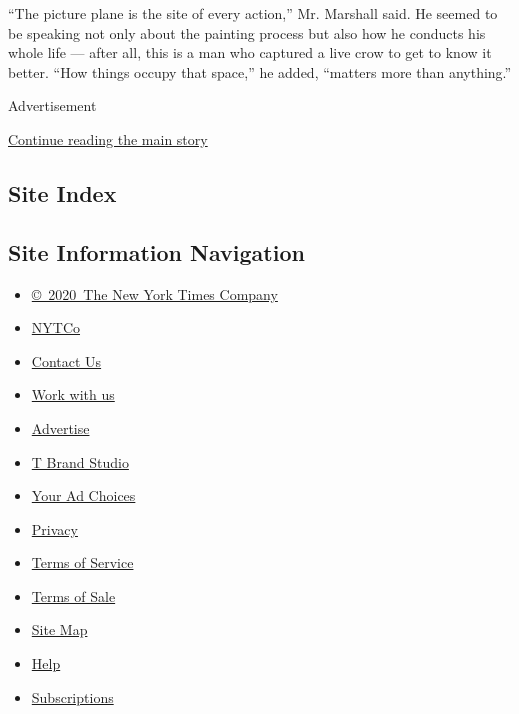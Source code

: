 ``The picture plane is the site of every action,'' Mr. Marshall said. He
seemed to be speaking not only about the painting process but also how
he conducts his whole life --- after all, this is a man who captured a
live crow to get to know it better. ``How things occupy that space,'' he
added, ``matters more than anything.''

Advertisement

\protect\hyperlink{after-bottom}{Continue reading the main story}

\hypertarget{site-index}{%
\subsection{Site Index}\label{site-index}}

\hypertarget{site-information-navigation}{%
\subsection{Site Information
Navigation}\label{site-information-navigation}}

\begin{itemize}
\tightlist
\item
  \href{https://help.nytimes3xbfgragh.onion/hc/en-us/articles/115014792127-Copyright-notice}{©~2020~The
  New York Times Company}
\end{itemize}

\begin{itemize}
\tightlist
\item
  \href{https://www.nytco.com/}{NYTCo}
\item
  \href{https://help.nytimes3xbfgragh.onion/hc/en-us/articles/115015385887-Contact-Us}{Contact
  Us}
\item
  \href{https://www.nytco.com/careers/}{Work with us}
\item
  \href{https://nytmediakit.com/}{Advertise}
\item
  \href{http://www.tbrandstudio.com/}{T Brand Studio}
\item
  \href{https://www.nytimes3xbfgragh.onion/privacy/cookie-policy\#how-do-i-manage-trackers}{Your
  Ad Choices}
\item
  \href{https://www.nytimes3xbfgragh.onion/privacy}{Privacy}
\item
  \href{https://help.nytimes3xbfgragh.onion/hc/en-us/articles/115014893428-Terms-of-service}{Terms
  of Service}
\item
  \href{https://help.nytimes3xbfgragh.onion/hc/en-us/articles/115014893968-Terms-of-sale}{Terms
  of Sale}
\item
  \href{https://spiderbites.nytimes3xbfgragh.onion}{Site Map}
\item
  \href{https://help.nytimes3xbfgragh.onion/hc/en-us}{Help}
\item
  \href{https://www.nytimes3xbfgragh.onion/subscription?campaignId=37WXW}{Subscriptions}
\end{itemize}
